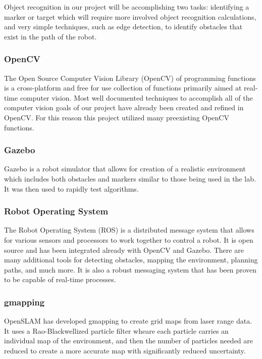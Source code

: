 \documentclass{article}[12]
\begin{document}
		Object recognition in our project will be accomplishing two tasks: identifying a marker or target which will require more involved object recognition calculations, and very simple techniques, such as edge detection, to identify obstacles that exist in the path of the robot.
		
		\subsubsection{OpenCV}
		
		The Open Source Computer Vision Library (OpenCV) of programming functions is a cross-platform and free for use collection of functions primarily aimed at real-time computer vision\cite{opencv}. Most well documented techniques to accomplish all of the computer vision goals of our project have already been created and refined in OpenCV.\cite{woods2015dynamic} For this reason this project utilized many preexisting OpenCV functions.
		
		\subsubsection{Gazebo}
		
		Gazebo is a robot simulator that allows for creation of a realistic environment which includes both obstacles and markers similar to those being used in the lab. It was then used to rapidly test algorithms.
		
		\subsubsection{Robot Operating System}
		
		The Robot Operating System (ROS) is a distributed message system that allows for various sensors and processors to work together to control a robot. It is open source and has been integrated already with OpenCV and Gazebo. There are many additional tools for detecting obstacles, mapping the environment, planning paths, and much more. It is also a robust messaging system that has been proven to be capable of real-time processes.
		
		\subsubsection{gmapping}
		
		OpenSLAM has developed gmapping to create grid maps from laser range data. It uses a Rao-Blackwellized particle filter wheare each particle carries an individual map of the environment, and then the number of particles needed are reduced to create a more accurate map with significantly reduced uncertainty.\cite{grisetti_stachniss_burgard}
		
\end{document}
